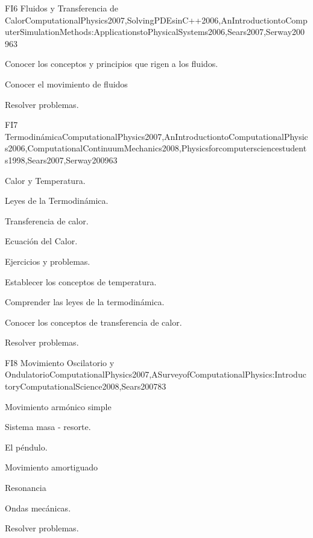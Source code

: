 \begin{syllabus}
\begin{unit}{FI6 Fluidos y Transferencia de Calor}{ComputationalPhysics2007,SolvingPDEsinC++2006,AnIntroductiontoComputerSimulationMethods:ApplicationstoPhysicalSystems2006,Sears2007,Serway2009}{6}{3}
   \begin{unitgoals}
      \item Conocer los conceptos y principios que rigen a los fluidos.
      \item Conocer el movimiento de fluidos 
      \item Resolver problemas.
   \end{unitgoals}
\end{unit}

\begin{unit}{FI7 Termodinámica}{ComputationalPhysics2007,AnIntroductiontoComputationalPhysics2006,ComputationalContinuumMechanics2008,Physicsforcomputersciencestudents1998,Sears2007,Serway2009}{6}{3}
\begin{topics}
      \item Calor y Temperatura.
      \item Leyes de la Termodinámica.
      \item Transferencia de calor.
      \item Ecuación del Calor.
      \item Ejercicios y problemas.
  \end{topics}

   \begin{unitgoals}
      \item Establecer los conceptos de temperatura.
      \item Comprender las leyes de la termodinámica.
      \item Conocer los conceptos de transferencia de calor.
      \item Resolver problemas.
   \end{unitgoals}
\end{unit}

\begin{unit}{FI8 Movimiento Oscilatorio y Ondulatorio}{ComputationalPhysics2007,ASurveyofComputationalPhysics:IntroductoryComputationalScience2008,Sears2007}{8}{3}
\begin{topics}
      \item Movimiento armónico simple
      \item Sistema masa - resorte.
      \item El péndulo.
      \item Movimiento amortiguado
      \item Resonancia
      \item Ondas mecánicas.
      \item Resolver problemas.
  \end{topics}


\end{unit}
\end{syllabus}
